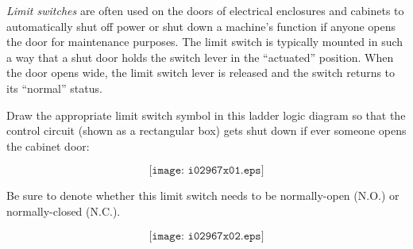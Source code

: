 

{\it Limit switches} are often used on the doors of electrical enclosures and cabinets to automatically shut off power or shut down a machine's function if anyone opens the door for maintenance purposes.  The limit switch is typically mounted in such a way that a shut door holds the switch lever in the ``actuated'' position.  When the door opens wide, the limit switch lever is released and the switch returns to its ``normal'' status.

Draw the appropriate limit switch symbol in this ladder logic diagram so that the control circuit (shown as a rectangular box) gets shut down if ever someone opens the cabinet door:

$$\texttt{[image: i02967x01.eps]}$$

Be sure to denote whether this limit switch needs to be normally-open (N.O.) or normally-closed (N.C.).







$$\texttt{[image: i02967x02.eps]}$$










